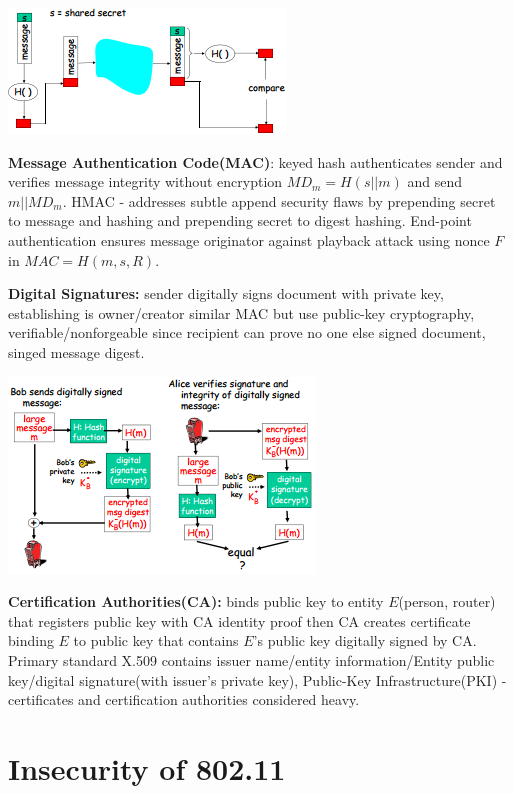 \documentclass[9pt]{extarticle}
\begin{document}
\begin{multicols}{2}
\includegraphics{mac.png}

\textbf{Message Authentication Code(MAC)}: keyed hash authenticates sender and verifies message integrity without encryption $MD_m = H(s||m)$ and send $m||MD_m$. HMAC - addresses subtle append security flaws by prepending secret to message and hashing and prepending secret to digest hashing. End-point authentication ensures message originator against playback attack using nonce $F$ in $MAC=H(m,s,R)$.

\textbf{Digital Signatures:} sender digitally signs document with private key, establishing is owner/creator similar MAC but use public-key cryptography, verifiable/nonforgeable since recipient can prove no one else signed document, singed message digest.

\includegraphics{ds.png}

\textbf{Certification Authorities(CA): }binds public key to entity $E$(person, router) that registers public key with CA identity proof then CA creates certificate binding $E$ to public key that contains $E$'s public key digitally signed by CA. Primary standard X.509 contains issuer name/entity information/Entity public key/digital signature(with issuer’s private key), Public-Key Infrastructure(PKI) -certificates and certification authorities considered heavy.

\section{Insecurity of 802.11}


\end{multicols}
\end{document}
